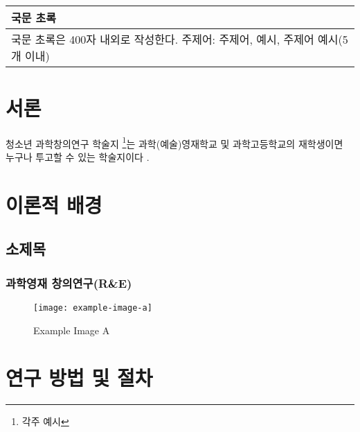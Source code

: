 \documentclass[10pt]{article}
\begin{document}
\begin{center}
	\fontsize{16pt}{16pt}\selectfont{\bf R\&E 과제명(국문)}\\
	\vspace{0.25cm}
	\fontsize{10pt}{10pt}\selectfont{ 저자명\textperiodcentered  저자명 \\}
	\fontsize{9pt}{9pt}\selectfont{ 과학영재학교 공동과학고등학교 \\}
	\vspace{0.6cm}
	\fontsize{16pt}{16pt}\selectfont{\bf Title(English) \\}
	\vspace{0.25cm}
	\fontsize{10pt}{10pt}\selectfont{ author name\textperiodcentered  author name \\}
	\fontsize{9pt}{9pt}\selectfont{ Gongdong Science High School for the Gifted\\}
\end{center}
\begin{table}[h]
	\begin{tabular}{p{\textwidth}}
		{\centering \large \bf \hspace{7.6cm} 국문 초록} \\
		\hline
		국문 초록은 400자 내외로 작성한다. 주제어: 주제어, 예시, 주제어 예시(5개 이내) \\
		\hline
	\end{tabular}
\end{table}
\section{서론}
청소년 과학창의연구 학술지 \footnote{각주 예시}는 과학(예술)영재학교 및 과학고등학교의 재학생이면 누구나 투고할 수 있는 학술지이다 \cite{song}.
\section{이론적 배경}
\subsection{소제목}
\subsubsection{과학영재 창의연구(R\&E)}
\lipsum[1]
\begin{figure}[h]
	\centering
	\texttt{[image: example-image-a]}
	\caption{Example Image A}
	\label{fig:ex}
\end{figure}
\section{연구 방법 및 절차}
\lipsum[2]
\begin{thebibliography}{00}
\end{thebibliography}
\end{document}
